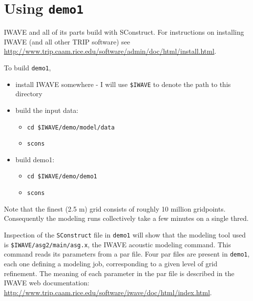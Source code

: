 \section{Using {\tt demo1}}
IWAVE and all of its parts build with SConstruct. For instructions on
installing IWAVE (and all other TRIP software) see 
\url{http://www.trip.caam.rice.edu/software/admin/doc/html/install.html}.

To build {\tt demo1},
\begin{itemize}
\item install IWAVE somewhere - I will use  {\tt \$IWAVE} to denote
  the path to this directory  
\item build the input data:
\begin{itemize} 
  \item {\tt cd \$IWAVE/demo/model/data}
\item {\tt scons}
\end{itemize}
\item build demo1:
\begin{itemize}
\item {\tt cd \$IWAVE/demo/demo1}
\item {\tt scons}
\end{itemize}
\end{itemize}
Note that the finest (2.5 m) grid consists of roughly 10 million
gridpoints. Consequently the modeling runs collectively take a few
minutes on a single thred.

Inspection of the {\tt SConstruct} file in {\tt demo1} will show that
the modeling tool used is {\tt \$IWAVE/asg2/main/asg.x}, the IWAVE
acoustic modeling command. This command reads its parameters from a
par file. Four par files are present in {\tt demo1}, each one defining
a modeling job, corresponding to a given level of grid refinement. The
meaning of each parameter in the par file is described in the IWAVE
web documentation:
\url{http://www.trip.caam.rice.edu/software/iwave/doc/html/index.html}.




